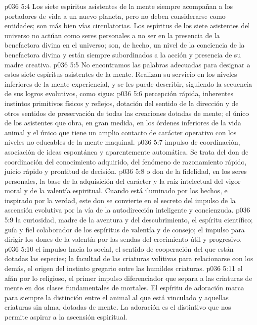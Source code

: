 \vs p036 5:4 \pc Los siete espíritus asistentes de la mente siempre acompañan a los portadores de vida a un nuevo planeta, pero no deben considerarse como entidades; son más bien vías circulatorias. Los espíritus de los siete asistentes del universo no actúan como seres personales a no ser en la presencia de la benefactora divina en el universo; son, de hecho, un nivel de la conciencia de la benefactora divina y están siempre subordinados a la acción y presencia de su madre creativa.
\vs p036 5:5 No encontramos las palabras adecuadas para designar a estos siete espíritus asistentes de la mente. Realizan su servicio en los niveles inferiores de la mente experiencial, y se les puede describir, siguiendo la secuencia de sus logros evolutivos, como sigue:
\vs p036 5:6  percepción rápida, inherentes instintos primitivos físicos y reflejos, dotación del sentido de la dirección y de otros sentidos de preservación de todas las creaciones dotadas de mente; el único de los asistentes que obra, en gran medida, en los órdenes inferiores de la vida animal y el único que tiene un amplio contacto de carácter operativo con los niveles no educables de la mente maquinal.
\vs p036 5:7  impulso de coordinación, asociación de ideas espontánea y aparentemente automática. Se trata del don de coordinación del conocimiento adquirido, del fenómeno de razonamiento rápido, juicio rápido y prontitud de decisión.
\vs p036 5:8  o don de la fidelidad, en los seres personales, la base de la adquisición del carácter y la raíz intelectual del vigor moral y de la valentía espiritual. Cuando está iluminado por los hechos, e inspirado por la verdad, este don se convierte en el secreto del impulso de la ascensión evolutiva por la vía de la autodirección inteligente y concienzuda.
\vs p036 5:9  la curiosidad, madre de la aventura y del descubrimiento, el espíritu científico; guía y fiel colaborador de los espíritus de valentía y de consejo; el impulso para dirigir los dones de la valentía por las sendas del crecimiento útil y progresivo.
\vs p036 5:10  el impulso hacia lo social, el sentido de cooperación del que están dotadas las especies; la facultad de las criaturas volitivas para relacionarse con los demás, el origen del instinto gregario entre las humildes criaturas.
\vs p036 5:11  el afán por lo religioso, el primer impulso diferenciador que separa a las criaturas de mente en dos clases fundamentales de mortales. El espíritu de adoración marca para siempre la distinción entre el animal al que está vinculado y aquellas criaturas sin alma, dotadas de mente. La adoración es el distintivo que nos permite aspirar a la ascensión espiritual.
